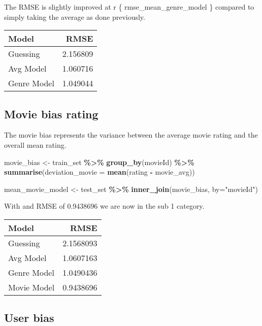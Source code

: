 \documentclass[
]{article}
\newenvironment{Shaded}{\begin{snugshade}}{\end{snugshade}}
\newcommand{\AttributeTok}[1]{\textcolor[rgb]{0.13,0.29,0.53}{#1}}
\newcommand{\FunctionTok}[1]{\textcolor[rgb]{0.13,0.29,0.53}{\textbf{#1}}}
\newcommand{\NormalTok}[1]{#1}
\newcommand{\OtherTok}[1]{\textcolor[rgb]{0.56,0.35,0.01}{#1}}
\newcommand{\SpecialCharTok}[1]{\textcolor[rgb]{0.81,0.36,0.00}{\textbf{#1}}}
\newcommand{\StringTok}[1]{\textcolor[rgb]{0.31,0.60,0.02}{#1}}
\begin{document}
The RMSE is slightly improved at r \{ rmse\_mean\_genre\_model \}
compared to simply taking the average as done previously.

\begin{tabular}{l|r}
\hline
Model & RMSE\\
\hline
Guessing & 2.156809\\
\hline
Avg Model & 1.060716\\
\hline
Genre Model & 1.049044\\
\hline
\end{tabular}

\newpage

\hypertarget{movie-bias-rating}{%
\subsection{Movie bias rating}\label{movie-bias-rating}}

The movie bias represents the variance between the average movie rating
and the overall mean rating.

\begin{Shaded}
\begin{Highlighting}[]
\NormalTok{movie\_bias }\OtherTok{\textless{}{-}}\NormalTok{ train\_set }\SpecialCharTok{\%\textgreater{}\%}
  \FunctionTok{group\_by}\NormalTok{(movieId) }\SpecialCharTok{\%\textgreater{}\%}
  \FunctionTok{summarise}\NormalTok{(}\AttributeTok{deviation\_movie =} \FunctionTok{mean}\NormalTok{(rating }\SpecialCharTok{{-}}\NormalTok{ movie\_avg))}

\NormalTok{mean\_movie\_model }\OtherTok{\textless{}{-}}\NormalTok{ test\_set }\SpecialCharTok{\%\textgreater{}\%}
  \FunctionTok{inner\_join}\NormalTok{(movie\_bias, }\AttributeTok{by=}\StringTok{"movieId"}\NormalTok{)}
\end{Highlighting}
\end{Shaded}

With and RMSE of 0.9438696 we are now in the sub 1 category.

\begin{tabular}{l|r}
\hline
Model & RMSE\\
\hline
Guessing & 2.1568093\\
\hline
Avg Model & 1.0607163\\
\hline
Genre Model & 1.0490436\\
\hline
Movie Model & 0.9438696\\
\hline
\end{tabular}

\hypertarget{user-bias}{%
\subsection{User bias}\label{user-bias}}
\end{document}

